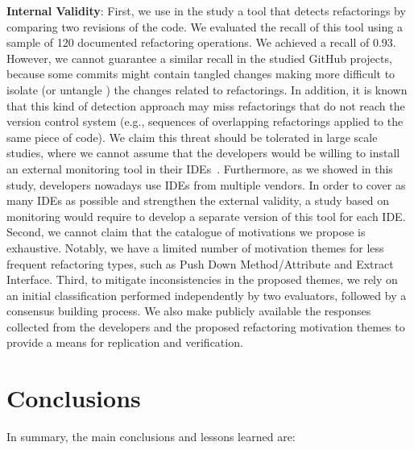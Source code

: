 \noindent \textbf{Internal Validity}: First, we use in the study a tool that detects refactorings by comparing 
two revisions of the code.
We evaluated the recall of this tool using a sample of 120 documented refactoring operations. We achieved a recall of 0.93.
However, we cannot guarantee a similar recall in the studied GitHub projects, because some commits might contain tangled changes making more difficult to isolate (or untangle \citep{Dias:2015}) the changes related to refactorings.
In addition, it is known that this kind of detection approach may miss refactorings that do not reach the 
version control system (e.g., sequences of overlapping refactorings applied to the same piece of code).
We claim this threat should be tolerated in large scale studies, where we cannot assume that the developers would be willing to install an external monitoring tool in their IDEs~\citep{negara2013}.
Furthermore, as we showed in this study, developers nowadays use IDEs from multiple vendors.
In order to cover as many IDEs as possible and strengthen the external validity,
a study based on monitoring would require to develop a separate version of this tool for each IDE.
Second, we cannot claim that the catalogue of motivations we propose is exhaustive.
Notably, we have a limited number of motivation themes 
for less frequent refactoring types, such as {\textsc Push Down Method/Attribute} and {\textsc Extract 
Interface}.
Third, to mitigate inconsistencies in the proposed themes, we rely on an initial classification
performed independently by two evaluators, followed by a consensus building process.
We also make publicly available the responses collected from the developers and the proposed
refactoring motivation themes to provide a means for replication and verification.

\section{Conclusions}

In summary, the main conclusions and lessons learned are:

